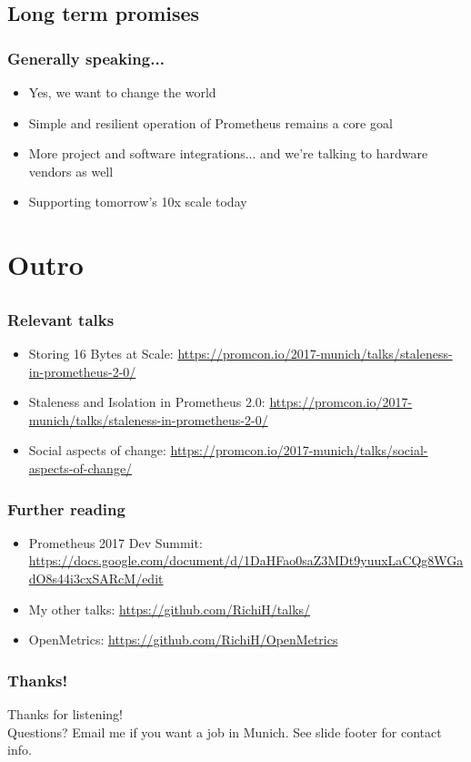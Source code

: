 \documentclass[t]{beamer}
\begin{document}
\subsection{Long term promises}

\begin{frame}
	\frametitle{Generally speaking...}
	\begin{itemize}
		\item Yes, we want to change the world
		\item Simple and resilient operation of Prometheus remains a core goal
		\item More project and software integrations... and we're talking to hardware vendors as well
		\item Supporting tomorrow's 10x scale today
	\end{itemize}
\end{frame}



\section{Outro}


\subsection{}

\begin{frame}
	\frametitle{Relevant talks}
	\begin{itemize}
		\item Storing 16 Bytes at Scale: \url{https://promcon.io/2017-munich/talks/staleness-in-prometheus-2-0/}
		\item Staleness and Isolation in Prometheus 2.0: \url{https://promcon.io/2017-munich/talks/staleness-in-prometheus-2-0/}
		\item Social aspects of change: \url{https://promcon.io/2017-munich/talks/social-aspects-of-change/}
	\end{itemize}
\end{frame}


\begin{frame}
	\frametitle{Further reading}
	\begin{itemize}
		\item Prometheus 2017 Dev Summit: \url{https://docs.google.com/document/d/1DaHFao0saZ3MDt9yuuxLaCQg8WGadO8s44i3cxSARcM/edit}
		\item My other talks: \url{https://github.com/RichiH/talks/}
		\item OpenMetrics: \url{https://github.com/RichiH/OpenMetrics}
	\end{itemize}
\end{frame}

\begin{frame}
	\frametitle{Thanks!}
		\begin{center}
			\vfill
			Thanks for listening!\\
			\vfill
			Questions?
			\vfill
			Email me if you want a job in Munich.
			\vfill
			See slide footer for contact info.
			\vfill
		\end{center}
\end{frame}
\end{document}
